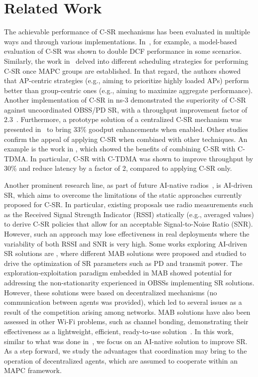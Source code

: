 \section{Related Work}
\label{sec:related_work}

The achievable performance of C-SR mechanisms has been evaluated in multiple ways and through various implementations. In~\cite{nunez2024spatial}, for example, a model-based evaluation of \mbox{C-SR} was shown to double DCF performance in some scenarios. Similarly, the work in~\cite{nunez2023multi} delved into different scheduling strategies for performing C-SR once MAPC groups are established. In that regard, the authors showed that AP-centric strategies (e.g., aiming to prioritize highly loaded APs) perform better than group-centric ones (e.g., aiming to maximize aggregate performance). Another implementation of C-SR in ns-3 demonstrated the superiority of C-SR against uncoordinated OBSS/PD SR, with a throughput improvement factor of $2.3$~\cite{imputato2024beyond}. Furthermore, a prototype solution of a centralized C-SR mechanism was presented in~\cite{haxhibeqiri2024coordinated, haxhibeqiri2024commag} to bring $33$\% goodput enhancements when enabled. Other studies confirm the appeal of applying C-SR when combined with other techniques. An example is the work in \cite{nunez2022txop}, which showed the benefits of combining C-SR with C-TDMA. In particular, C-SR with C-TDMA was shown to improve throughput by 30\% and reduce latency by a factor of 2, compared to applying C-SR only. 

Another prominent research line, as part of future AI-native radios~\cite{wilhelmi2024machine}, is AI-driven SR, which aims to overcome the limitations of the static approaches currently proposed for C-SR. In particular, existing proposals use radio measurements such as the Received Signal Strength Indicator (RSSI) statically (e.g., averaged values) to derive C-SR policies that allow for an acceptable Signal-to-Noise Ratio (SNR). However, such an approach may lose effectiveness in real deployments where the variability of both RSSI and SNR is very high. Some works exploring AI-driven SR solutions are \cite{wilhelmi2019potential, wilhelmi2019collaborative}, where different MAB solutions were proposed and studied to drive the optimization of SR parameters such as PD and transmit power. The exploration-exploitation paradigm embedded in MAB showed potential for addressing the non-stationarity experienced in OBSSs implementing SR solutions. However, these solutions were based on decentralized mechanisms (no communication between agents was provided), which led to several issues as a result of the competition arising among networks. MAB solutions have also been assessed in other Wi-Fi problems, such as channel bonding, demonstrating their effectiveness as a lightweight, efficient, ready-to-use solution~\cite{barrachina2021multi}. In this work, similar to what was done in~\cite{wilhelmi2019potential, wilhelmi2019collaborative}, we focus on an AI-native solution to improve SR. As a step forward, we study the advantages that coordination may bring to the operation of decentralized agents, which are assumed to cooperate within an MAPC framework.